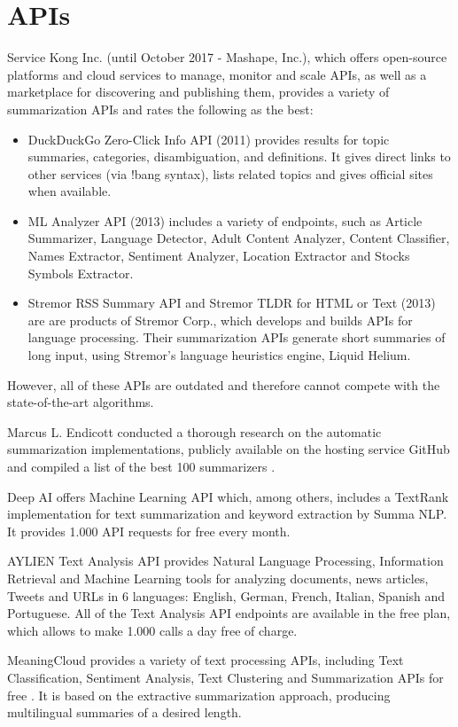 \documentclass[11pt,a4paper,onecolumn]{article}
\begin{document}
\section{APIs}
Service Kong Inc. (until October 2017 - Mashape, Inc.), which offers open-source platforms and cloud services to manage, monitor and scale APIs, as well as a marketplace for discovering and publishing them, provides a variety of summarization APIs and rates the following as the best:
\begin{itemize}
\item DuckDuckGo Zero-Click Info API (2011) provides results for topic summaries, categories, disambiguation, and definitions. It gives direct links to other services (via !bang syntax), lists related topics and gives official sites when available.
\item ML Analyzer API (2013) includes a variety of endpoints, such as Article Summarizer, Language Detector, Adult Content Analyzer, Content Classifier, Names Extractor, Sentiment Analyzer, Location Extractor and Stocks Symbols Extractor.
\item Stremor RSS Summary API and Stremor TLDR for HTML or Text (2013) are are products of Stremor Corp., which develops and builds APIs for language processing. Their summarization APIs generate short summaries of long input, using Stremor's language heuristics engine, Liquid Helium.
\end{itemize}
However, all of these APIs are outdated and therefore cannot compete with the state-of-the-art algorithms.

Marcus L. Endicott conducted a  thorough research on the automatic summarization  implementations, publicly available on  the hosting service GitHub and compiled a list of the best 100 summarizers \cite{endicot2017Top100}.

Deep AI offers Machine Learning API \cite{deepaiapi} which, among others, includes a TextRank implementation for text summarization and keyword extraction by Summa NLP.
It provides 1.000 API requests for free every month.

AYLIEN Text Analysis API \cite{aylienapi} provides Natural Language Processing, Information Retrieval and Machine Learning tools for analyzing documents, news articles, Tweets and URLs in 6 languages: English, German, French, Italian, Spanish and Portuguese.
All of the Text Analysis API endpoints are available in the free plan, which allows to make 1.000 calls a day free of charge.

MeaningCloud provides a variety of text processing APIs, including Text Classification, Sentiment Analysis, Text Clustering and Summarization APIs for free \cite{meaaningcloud2017api}.
It is based on the extractive summarization approach, producing multilingual summaries of a desired length.
\end{document}
